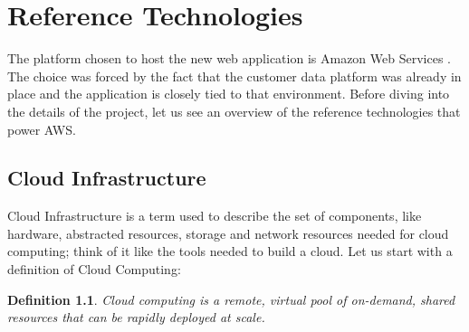 \graphicspath{{./chapters/images/}}
\newtheorem*{definition}{Definition}

\chapter{Reference Technologies}
The platform chosen to host the new web application is Amazon Web Services \cite{aws}. The choice was forced by the fact that the customer data platform was already in place and the application is closely tied to that environment. Before diving into the details of the project, let us see an overview of the reference technologies that power AWS.




\section{Cloud Infrastructure}
Cloud Infrastructure is a term used to describe the set of components, like hardware, abstracted resources, storage and network resources needed for cloud computing; think of it like the tools needed to build a cloud.
Let us start with a definition of Cloud Computing:

\begin{definition}
  Cloud computing is a remote, virtual pool of on-demand, shared resources that can be rapidly deployed at scale.\cite{cloud}
\end{definition}

